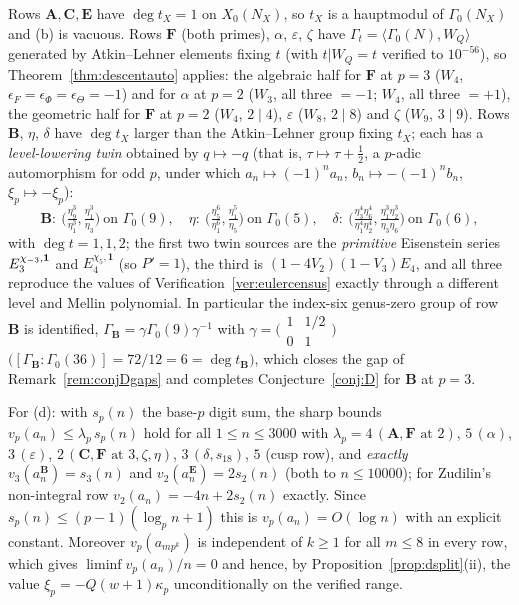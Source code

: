 \begin{verification}
\label{ver:hyp}
Rows $\mathbf A,\mathbf C,\mathbf E$ have $\deg t_X=1$ on $X_0(N_X)$, so $t_X$
is a hauptmodul of $\Gamma_0(N_X)$ and \textup{(b)} is vacuous.  Rows
$\mathbf F$ (both primes), $\alpha$, $\varepsilon$, $\zeta$ have
$\Gamma_t=\langle\Gamma_0(N),W_Q\rangle$ generated by Atkin--Lehner elements
fixing $t$ (with $t|W_Q=t$ verified to $10^{-56}$), so
Theorem~\ref{thm:descentauto} applies: the algebraic half for
$\mathbf F$ at $p=3$ ($W_4$, $\epsilon_F=\epsilon_\Phi=\epsilon_\Theta=-1$)
and for $\alpha$ at $p=2$ ($W_3$, all three $=-1$; $W_4$, all three $=+1$),
the geometric half for $\mathbf F$ at $p=2$ ($W_4$, $2\mid4$), $\varepsilon$
($W_8$, $2\mid8$) and $\zeta$ ($W_9$, $3\mid9$).  Rows $\mathbf B$, $\eta$, $\delta$ have
$\deg t_X$ larger than the Atkin--Lehner group fixing $t_X$; each has a
\emph{level-lowering twin} obtained by $q\mapsto-q$ (that is,
$\tau\mapsto\tau+\tfrac12$, a $p$-adic automorphism for odd $p$, under which
$a_n\mapsto(-1)^na_n$, $b_n\mapsto-(-1)^nb_n$, $\xi_p\mapsto-\xi_p$):
\[
\mathbf B:\ \bigl(\tfrac{\eta_9^3}{\eta_1^3},\tfrac{\eta_1^3}{\eta_3}\bigr)\ \text{on }\Gamma_0(9),
\quad
\eta:\ \bigl(\tfrac{\eta_5^6}{\eta_1^6},\tfrac{\eta_1^5}{\eta_5}\bigr)\ \text{on }\Gamma_0(5),
\quad
\delta:\ \bigl(\tfrac{\eta_3^4\eta_6^4}{\eta_1^4\eta_2^4},\tfrac{\eta_1^3\eta_2^3}{\eta_3\eta_6}\bigr)\ \text{on }\Gamma_0(6),
\]
with $\deg t=1,1,2$; the first two twin sources are the \emph{primitive}
Eisenstein series $E^{\chi_{-3},\mathbf 1}_3$ and $E^{\chi_5,\mathbf 1}_4$ (so
$P'=1$), the third is $(1-4V_2)(1-V_3)E_4$, and all three reproduce the values
of Verification~\ref{ver:eulercensus} exactly through a different level and
Mellin polynomial.  In particular the index-six genus-zero group of row
$\mathbf B$ is identified,
$\Gamma_{\mathbf B}=\gamma\Gamma_0(9)\gamma^{-1}$ with
$\gamma=\bigl(\begin{smallmatrix}1&1/2\\0&1\end{smallmatrix}\bigr)$
$\bigl([\Gamma_{\mathbf B}:\Gamma_0(36)]=72/12=6=\deg t_{\mathbf B}\bigr)$,
which closes the gap of Remark~\ref{rem:conjDgaps} and completes
Conjecture~\ref{conj:D} for $\mathbf B$ at $p=3$.

For \textup{(d)}: with $s_p(n)$ the base-$p$ digit sum, the sharp bounds
$v_p(a_n)\le\lambda_p\,s_p(n)$ hold for all $1\le n\le3000$ with
$\lambda_p=4\,(\mathbf A,\mathbf F\text{ at }2)$,
$5\,(\alpha)$, $3\,(\varepsilon)$, $2\,(\mathbf C,\mathbf F\text{ at }3,\zeta,\eta)$,
$3\,(\delta,s_{18})$, $5$ (cusp row), and \emph{exactly}
$v_3(a^{\mathbf B}_n)=s_3(n)$ and $v_2(a^{\mathbf E}_n)=2s_2(n)$ (both to $n\le10000$); for Zudilin's
non-integral row $v_2(a_n)=-4n+2s_2(n)$ exactly.  Since
$s_p(n)\le(p-1)(\log_pn+1)$ this is $v_p(a_n)=O(\log n)$ with an explicit
constant.  Moreover $v_p(a_{mp^k})$ is independent of $k\ge1$ for all $m\le8$
in every row, which gives $\liminf v_p(a_n)/n=0$ and hence, by
Proposition~\ref{prop:dsplit}(ii), the value $\xi_p=-Q(w+1)\kappa_p$
unconditionally on the verified range.
\end{verification}

